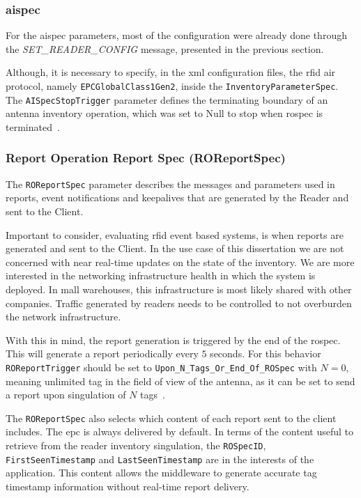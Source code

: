 \subsubsection{\acl{aispec}}

For the \ac{aispec} parameters, most of the configuration were already done through the \textit{SET\_READER\_CONFIG} message, presented in the previous section.

Although, it is necessary to specify, in the \ac{xml} configuration files, the \ac{rfid} air protocol, namely \texttt{EPCGlobalClass1Gen2}, inside the \texttt{InventoryParameterSpec}.
The \texttt{AISpecStopTrigger} parameter defines the terminating boundary of an antenna inventory operation, which was set to Null to stop when \ac{rospec} is terminated~\cite{LowLevelReader}.

\subsubsection{Report Operation Report Spec (ROReportSpec)}

The \texttt{ROReportSpec} parameter describes the messages and parameters used in reports, event notifications and keepalives that are generated by the Reader and sent to the Client.

Important to consider, evaluating \ac{rfid} event based systems, is when reports are generated and sent to the Client.
In the use case of this dissertation we are not concerned with near real-time updates on the state of the inventory. We are more interested in the networking infrastructure health in which the system is deployed. In mall warehouses, this infrastructure is most likely shared with other companies. Traffic generated by readers needs to be controlled to not overburden the network infrastructure.

With this in mind, the report generation is triggered by the end of the \ac{rospec}. This will generate a report periodically every $5$ seconds.
For this behavior \texttt{ROReportTrigger} should be set to \texttt{Upon\_N\_Tags\_Or\_End\_Of\_ROSpec} with $N=0$, meaning unlimited tag in the field of view of the antenna, as it can be set to send a report upon singulation of $N$ tags~\cite{LowLevelReader}.

The \texttt{ROReportSpec} also selects which content of each report sent to the client includes.
The \ac{epc} is always delivered by default.
In terms of the content useful to retrieve from the reader inventory singulation, the \texttt{ROSpecID}, \texttt{FirstSeenTimestamp} and \texttt{LastSeenTimestamp} are in the interests of the application. 
This content allows the middleware to generate accurate tag timestamp information without real-time report delivery.

